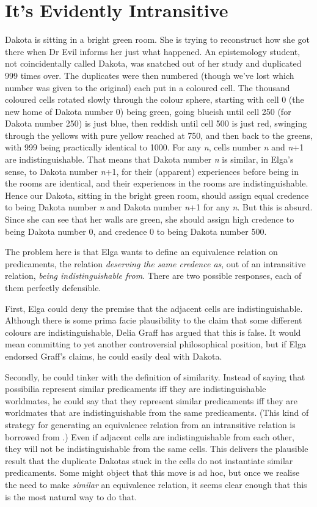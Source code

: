 \section{It's Evidently Intransitive}

Dakota is sitting in a bright green room. She is trying to reconstruct how she got there when Dr Evil informs her just what happened. An epistemology student, not coincidentally called Dakota, was snatched out of her study and duplicated 999 times over. The duplicates were then numbered (though we've lost which number was given to the original) each put in a coloured cell. The thousand coloured cells rotated slowly through the colour sphere, starting with cell 0 (the new home of Dakota number 0) being green, going blueish until cell 250 (for Dakota number 250) is just blue, then reddish until cell 500 is just red, swinging through the yellows with pure yellow reached at 750, and then back to the greens, with 999 being practically identical to 1000. For any \textit{n}, cells number \textit{n} and \textit{n}+1 are indistinguishable. That means that Dakota number \textit{n} is similar, in Elga's sense, to Dakota number \textit{n}+1, for their (apparent) experiences before being in the rooms are identical, and their experiences in the rooms are indistinguishable. Hence our Dakota, sitting in the bright green room, should assign equal credence to being Dakota number \textit{n} and Dakota number \textit{n}+1 for any \textit{n}. But this is absurd. Since she can see that her walls are green, she should assign high credence to being Dakota number 0, and credence 0 to being Dakota number 500.

The problem here is that Elga wants to define an equivalence relation on predicaments, the relation \textit{deserving the same credence as}, out of an intransitive relation, \textit{being indistinguishable from}. There are two possible responses, each of them perfectly defensible.

First, Elga could deny the premise that the adjacent cells are indistinguishable. Although there is some prima facie plausibility to the claim that some different colours are indistinguishable, Delia Graff \citet{Fara2001} has argued that this is false. It would mean committing to yet another controversial philosophical position, but if Elga endorsed Graff's claims, he could easily deal with Dakota.

Secondly, he could tinker with the definition of similarity. Instead of saying that possibilia represent similar predicaments iff they are indistinguishable worldmates, he could say that they represent similar predicaments iff they are worldmates that are indistinguishable from the same predicaments. (This kind of strategy for generating an equivalence relation from an intransitive relation is borrowed from \citet{Goodman1951}.) Even if adjacent cells are indistinguishable from each other, they will not be indistinguishable from the same cells. This delivers the plausible result that the duplicate Dakotas stuck in the cells do not instantiate similar predicaments. Some might object that this move is ad hoc, but once we realise the need to make \textit{similar} an equivalence relation, it seems clear enough that this is the most natural way to do that.


